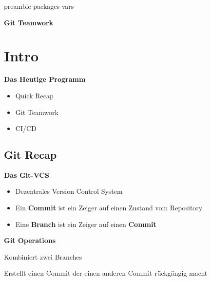 \RequirePackage{import}
{preamble}
{packages}
{vars}

    \begin{frame}[c]
        \centering
        \Large
        \textbf{Git Teamwork}
    \end{frame}


    \section{Intro}\label{sec:intro}
    \begin{frame}[c]
        \slidehead
        \vspace{-1em}
        \centering
        \large
        \textbf{Das Heutige Programm}
        \vspace{1em}
        \begin{itemize}
            [<+->]
            \item Quick Recap
            \item Git Teamwork
            \item CI/CD
        \end{itemize}
    \end{frame}

    \subsection{Git Recap}\label{subsec:git-recap}
    \begin{frame}[c]
        \slidehead
        \vspace{-1em}
        \centering
        \large
        \textbf{Das Git-VCS}
        \vspace{1em}
        \begin{itemize}
            [<+->]
            \item Dezentrales Version Control System
            \item Ein \textbf{Commit} ist ein Zeiger auf einen Zustand vom Repository
            \item Eine \textbf{Branch} ist ein Zeiger auf einen \textbf{Commit}
        \end{itemize}
    \end{frame}

    \begin{frame}[c]
        \slidehead
        \vspace{-1em}
        \centering
        \large
        \textbf{Git Operations}
        \vspace{2em}
        \begin{description}
            [<+->][labelwidth=\widthof{\bfseries The longest label}]
            \item [git merge] Kombiniert zwei Branches
            \item [git revert] Erstellt einen Commit der einen anderen Commit rückgängig macht
        \end{description}
    \end{frame}


